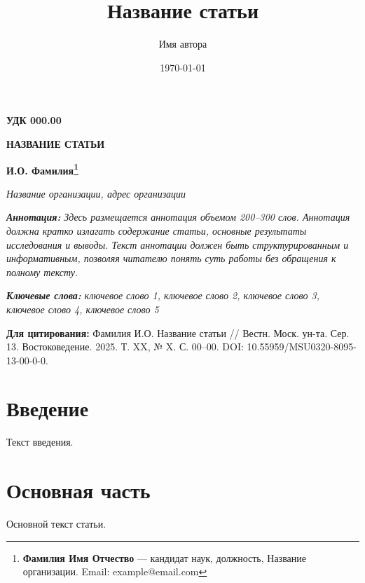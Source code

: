 \documentclass[12pt]{article}    %
\title{Название статьи}
\author{Имя автора}
\date{\today}
\newcommand{\udc}[1]{%
    \noindent\textbf{УДК #1}%
    \par\vspace{0.5em}%
}
\newcommand{\articletitleru}[1]{%
    \begin{center}
        \fontsize{14}{16}\selectfont\bfseries\MakeUppercase{#1}
    \end{center}
    \vspace{0.3em}
}
\newcommand{\authorru}[1]{%
    \begin{center}
        \fontsize{14}{16}\selectfont\bfseries #1
    \end{center}
    \vspace{0.3em}
}
\newcommand{\institution}[1]{%
    \begin{center}
        \fontsize{12}{14}\selectfont\itshape #1
    \end{center}
    \vspace{0.5em}
}
\newcommand{\abstractru}[1]{%
    \noindent\textbf{\textit{Аннотация:}} \textit{#1}%
    \par\vspace{0.5em}%
}
\newcommand{\keywordsru}[1]{%
    \noindent\textbf{\textit{Ключевые слова:}} \textit{#1}%
    \par\vspace{0.5em}%
}
\newcommand{\funding}[1]{%
    \noindent\textbf{Финансирование:} #1%
    \par\vspace{0.5em}%
}
\newcommand{\citation}[1]{%
    \noindent\textbf{Для цитирования:} #1%
    \par\vspace{1em}%
}
\begin{document}

\udc{000.00}

\articletitleru{Название статьи}

\authorru{И.О. Фамилия\footnote{%
    \textbf{Фамилия Имя Отчество} — кандидат наук, должность, Название организации. Email: example@email.com%
}}

\institution{Название организации, адрес организации}

\abstractru{Здесь размещается аннотация объемом 200--300 слов. Аннотация должна кратко излагать содержание статьи, основные результаты исследования и выводы. Текст аннотации должен быть структурированным и информативным, позволяя читателю понять суть работы без обращения к полному тексту.}

\keywordsru{ключевое слово 1, ключевое слово 2, ключевое слово 3, ключевое слово 4, ключевое слово 5}


\citation{Фамилия И.О. Название статьи // Вестн. Моск. ун-та. Сер. 13. Востоковедение. 2025. Т. XX, № X. С. 00--00. DOI: 10.55959/MSU0320-8095-13-00-0-0.}

\vspace{1em}


\section{Введение}

Текст введения.

\section{Основная часть}

Основной текст статьи.
\end{document}
